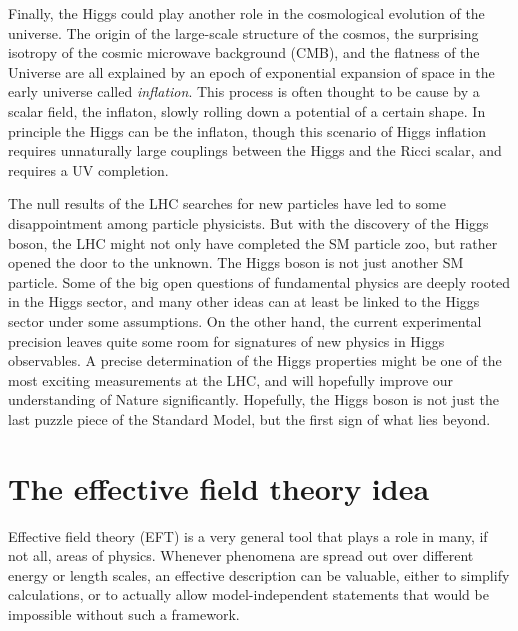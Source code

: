 Finally, the Higgs could play another role in the cosmological
evolution of the universe. The origin of the large-scale structure of
the cosmos, the surprising isotropy of the cosmic microwave background
(CMB), and the flatness of the Universe are all explained by an epoch
of exponential expansion of space in the early universe called
\emph{inflation}. This process is often thought to be cause by a
scalar field, the inflaton, slowly rolling down a potential of a
certain shape. In principle the Higgs can be the inflaton, though this
scenario of Higgs inflation requires unnaturally large couplings
between the Higgs and the Ricci scalar, and requires a UV completion.

\newparagraph
%
The null results of the LHC searches for new particles have led to
some disappointment among particle physicists. But with the discovery
of the Higgs boson, the LHC might not only have completed the SM
particle zoo, but rather opened the door to the unknown.  The Higgs
boson is not just another SM particle.  Some of the big open questions
of fundamental physics are deeply rooted in the Higgs sector, and many
other ideas can at least be linked to the Higgs sector under some
assumptions. On the other hand, the current experimental precision
leaves quite some room for signatures of new physics in Higgs
observables. A precise determination of the Higgs properties might be
one of the most exciting measurements at the LHC, and will hopefully
improve our understanding of Nature significantly. Hopefully, the
Higgs boson is not just the last puzzle piece of the Standard Model,
but the first sign of what lies beyond.



\section{The effective field theory idea}
\label{sec:foundations_eft}

Effective field theory (EFT) is a very general tool that plays a role
in many, if not all, areas of physics. Whenever phenomena are spread
out over different energy or length scales, an effective description
can be valuable, either to simplify calculations, or to actually allow
model-independent statements that would be impossible without such a
framework.



